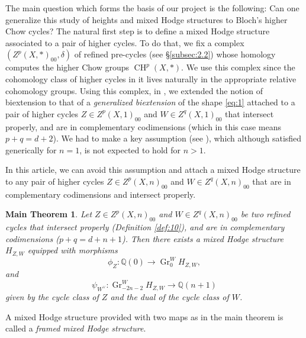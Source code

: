 \documentclass[11pt,a4paper]{amsart}
\newcommand{\Q}{\mathds{Q}}
\DeclareMathOperator {\Gr} {Gr}
\DeclareMathOperator {\CH}{CH}
\numberwithin{equation}{section}
\theoremstyle{plain}
\newtheorem*{mainthm}{Main Theorem}
\theoremstyle{definition}
\begin{document}
The main question which forms the basis of our project is
the following: Can one generalize this study of heights and mixed Hodge structures to Bloch's
higher Chow cycles? The natural first step is to define a mixed Hodge
structure associated to a pair of higher cycles. To do that, we fix a
complex $(Z^{p}(X,\ast)_{00},\delta)$ of refined pre-cycles (see
\S \ref{subsec:2.2})
whose homology computes the higher Chow groups $\CH^{p}(X,\ast)$. We
use this complex since the cohomology class of higher cycles in it
lives naturally in the appropriate relative cohomology groups. Using this complex, in
\cite{BGGP:Height}, we extended the notion of biextension to that of a
\textit{generalized biextension} of the shape \eqref{eq:1} attached to a
pair of higher cycles $Z\in Z^{p}(X,1)_{00}$ and $W\in Z^{q}(X,1)_{00}$
that intersect properly, and are in complementary codimensions (which
in this case means $p+q=d+2$). We had to make a key assumption (see
\cite[Assumption 3.27]{BGGP:Height}), which although satisfied
generically for $n=1$, is not expected to hold for $n>1$.

In this article, we can avoid this assumption and attach a
mixed Hodge structure to any pair of
higher cycles $Z\in Z^{p}(X,n)_{00}$ and $W\in Z^{q}(X,n)_{00}$ that are in complementary codimensions and intersect properly. 

\begin{mainthm}\label{mainthm}
Let $Z\in Z^{p}(X,n)_{00}$ and $W\in Z^{q}(X,n)_{00}$ be two  refined
cycles that intersect properly (Definition \ref{def:10}), and are in
complementary codimensions ($p+q=d+n+1$). Then there exists a mixed
Hodge structure $H_{Z,W}$ equipped with morphisms 
\begin{displaymath}
\phi_{Z}\colon \Q(0)\rightarrow \Gr^{W}_{0}H_{Z,W},
\end{displaymath}
and
\begin{displaymath}
\psi_{W^{\vee}}\colon \Gr^{W}_{-2n-2}H_{Z,W}\rightarrow \Q(n+1)
\end{displaymath}
given by the cycle class of $Z$ and the dual of the cycle class of
$W$. 
\end{mainthm}
A mixed Hodge structure provided with two maps as in the main theorem
is called a \emph{framed mixed Hodge structure}.
\end{document}
